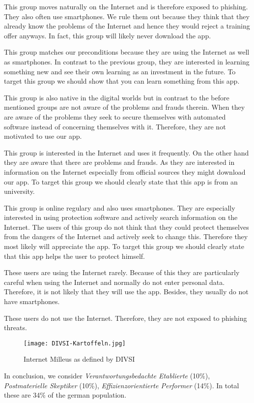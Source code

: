 \begin{description}[leftmargin=0cm]
\item[Digital Souver\"{a}ne] This group moves naturally on the Internet and is therefore exposed to phishing. They also often use smartphones. We rule them out because they think that they already know the problems of the Internet and hence they would reject a training offer anyways. In fact, this group will likely never download the app.
\item[Effizienzorientierte Performer] This group matches our preconditions because they are using the Internet as well as smartphones. In contrast to the previous group, they are interested in learning something new and see their own learning as an investment in the future. To target this group we should show that you can learn something from this app.
\item[Unbek\"{u}mmerte Hedonisten] This group is also native in the digital worlds but in contrast to the before mentioned groups are not aware of the problems and frauds therein. When they are aware of the problems they seek to secure themselves with automated software instead of concerning themselves with it. Therefore, they are not motivated to use our app.
\item[Postmaterielle Skeptiker] This group is interested in the Internet and uses it frequently. On the other hand they are aware that there are problems and frauds. As they are interested in information on the Internet especially from official sources they might download our app. To target this group we should clearly state that this app is from an university.
\item[Verantwortungsbedachte Etablierte] This group is online regulary and also uses smartphones. They are especially interested in using protection software and actively search information on the Internet. The users of this group do not think that they could protect themselves from the dangers of the Internet and actively seek to change this. Therefore they most likely will appreciate the app. To target this group we should clearly state that this app helps the user to protect himself.
\item[Ordnungsfordernde Internet-Laien] These users are using the Internet rarely. Because of this they are particularly careful when using the Internet and normally do not enter personal data. Therefore, it is not likely that they will use the app. Besides, they usually do not have smartphones.
\item[Internetferne Verunsicherte] These users do not use the Internet. Therefore, they are not exposed to phishing threats.
\end{description}

\begin{figure}[hHtbp]
\centering
\texttt{[image: DIVSI-Kartoffeln.jpg]}
\caption{Internet Milleus as defined by DIVSI}
\label{fig:divsi_kartoffeln}
\end{figure}

In conclusion, we consider \textit{Verantwortungsbedachte Etablierte} (10\%),  \textit{Postmaterielle Skeptiker} (10\%),  \textit{Effizienzorientierte Performer} (14\%). In total these are 34\% of the german population.
